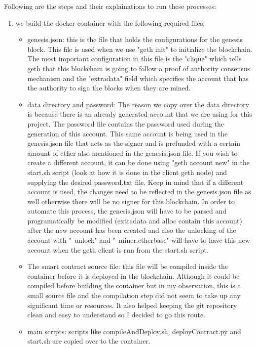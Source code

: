 \documentclass{article}
\begin{document}
Following are the steps and their explainations to run these processes:
\begin{enumerate}
    \item we build the docker container with the following required files:
    \begin{itemize}
        \item genesis.json: this is the file that holds the configurations for the genesis block. This file is used when we use "geth init" to initialize the blockchain. The most important configuration in this file is the "clique" which tells geth that this blockchain is going to follow a proof of authority consensus mechanism and the "extradata" field which specifies the account that has the authority to sign the blocks when they are mined.
        \item data directory and password: The reason we copy over the data directory is because there is an already generated account that we are using for this project. The password file contains the password used during the generation of this account. This same account is being used in the genesis.json file that acts as the signer and is prefunded with a certain amount of ether also mentioned in the genesis.json file. If you wish to create a different account, it can be done using "geth account new" in the start.sh script (look at how it is done in the client geth node) and supplying the desired password.txt file. Keep in mind that if a different account is used, the changes need to be reflected in the genesis.json file as well otherwise there will be no signer for this blockchain. In order to automate this process, the genesis.json will have to be parsed and programatically be modified (extradata and alloc contain this account) after the new account has been created and also the unlocking of the account with "--unlock" and "--miner.etherbase" will have to have this new account when the geth client is run from the start.sh script.
        \item The smart contract source file: this file will be compiled inside the container before it is deployed in the blockchain. Although it could be compiled before building the container but in my observation, this is a small source file and the compilation step did not seem to take up any significant time or resources. It also helped keeping the git repository clean and easy to understand so I decided to go this route.
        \item main scripts: scripts like compileAndDeploy.sh, deployContract.py and start.sh are copied over to the container.

\end{itemize}
\end{enumerate}
\end{document}

